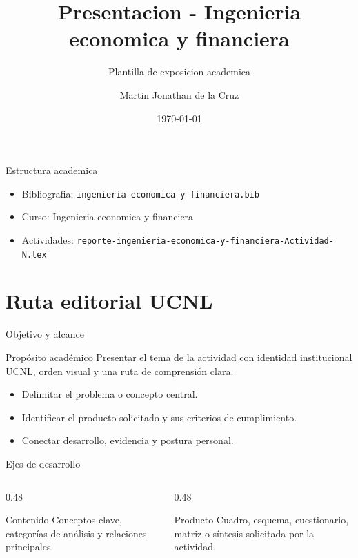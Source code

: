 ﻿\documentclass[spanish,aspectratio=169]{beamer}
\title{Presentacion - Ingenieria economica y financiera}
\subtitle{Plantilla de exposicion academica}
\author{Martin Jonathan de la Cruz}
\institute{Universidad Ciudadana de Nuevo Leon}
\date{\today}
\begin{document}
\begin{frame}
  \titlepage
\end{frame}

\begin{frame}{Estructura academica}
  \begin{itemize}
    \item Bibliografia: \texttt{ingenieria-economica-y-financiera.bib}
    \item Curso: Ingenieria economica y financiera
    \item Actividades: \texttt{reporte-ingenieria-economica-y-financiera-Actividad-N.tex}
  \end{itemize}
\end{frame}


\section{Ruta editorial UCNL}

\begin{frame}{Objetivo y alcance}
  \begin{block}{Propósito académico}
    Presentar el tema de la actividad con identidad institucional UCNL, orden visual y una ruta de comprensión clara.
  \end{block}
  \begin{itemize}
    \item Delimitar el problema o concepto central.
    \item Identificar el producto solicitado y sus criterios de cumplimiento.
    \item Conectar desarrollo, evidencia y postura personal.
  \end{itemize}
\end{frame}

\begin{frame}{Ejes de desarrollo}
  \begin{columns}[T,totalwidth=\textwidth]
    \begin{column}{0.48\textwidth}
      \begin{block}{Contenido}
        Conceptos clave, categorías de análisis y relaciones principales.
      \end{block}
    \end{column}
    \begin{column}{0.48\textwidth}
      \begin{block}{Producto}
        Cuadro, esquema, cuestionario, matriz o síntesis solicitada por la actividad.
      \end{block}
    \end{column}
  \end{columns}
\end{frame}
\end{document}
